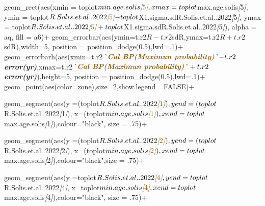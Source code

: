 \documentclass[
]{article}
\newenvironment{Shaded}{\begin{snugshade}}{\end{snugshade}}
\newcommand{\CommentTok}[1]{\textcolor[rgb]{0.56,0.35,0.01}{\textit{#1}}}
\newcommand{\InformationTok}[1]{\textcolor[rgb]{0.56,0.35,0.01}{\textbf{\textit{#1}}}}
\newcommand{\NormalTok}[1]{#1}
\newcommand{\OtherTok}[1]{\textcolor[rgb]{0.56,0.35,0.01}{#1}}
\begin{document}
\begin{Shaded}
\begin{Highlighting}[]
\NormalTok{  geom\_rect(aes(xmin = toplot$min.age.solis}\CommentTok{[}\OtherTok{5}\CommentTok{]}\NormalTok{, }
\NormalTok{                xmax = toplot$max.age.solis}\CommentTok{[}\OtherTok{5}\CommentTok{]}\NormalTok{, }
\NormalTok{                ymin = toplot$R.Solis.et.al..2022}\CommentTok{[}\OtherTok{5}\CommentTok{]}\NormalTok{{-}toplot$X1.sigma.sdR.Solis.et.al..2022}\CommentTok{[}\OtherTok{5}\CommentTok{]}\NormalTok{,}
\NormalTok{                ymax = toplot$R.Solis.et.al..2022}\CommentTok{[}\OtherTok{5}\CommentTok{]}\NormalTok{+toplot$X1.sigma.sdR.Solis.et.al..2022}\CommentTok{[}\OtherTok{5}\CommentTok{]}\NormalTok{),}
\NormalTok{            alpha = aq,}
\NormalTok{            fill = a6)+}
\NormalTok{  geom\_errorbar(aes(ymin=t.r2$R{-}t.r2$sdR,ymax=t.r2$R+t.r2$sdR),width=5,}
\NormalTok{                            position = position\_dodge(0.5),lwd=.1)+}
\NormalTok{  geom\_errorbarh(aes(xmin=t.r2$}\InformationTok{\textasciigrave{}Cal BP(Maximun probability)\textasciigrave{}}\NormalTok{{-}t.r2$}\InformationTok{\textasciigrave{}error(yr)\textasciigrave{}}\NormalTok{,xmax=t.r2$}\InformationTok{\textasciigrave{}Cal BP(Maximun probability)\textasciigrave{}}\NormalTok{+t.r2$}\InformationTok{\textasciigrave{}error(yr)\textasciigrave{}}\NormalTok{),height=5,}
\NormalTok{              position = position\_dodge(0.5),lwd=.1)+}
\NormalTok{              geom\_point(aes(color=zone),size=2,show.legend =FALSE)+}
  
\NormalTok{  geom\_segment(aes(y =(toplot$R.Solis.et.al..2022}\CommentTok{[}\OtherTok{1}\CommentTok{]}\NormalTok{),}
\NormalTok{                   yend =(toplot$R.Solis.et.al..2022}\CommentTok{[}\OtherTok{1}\CommentTok{]}\NormalTok{),}
\NormalTok{                   x=(toplot$min.age.solis}\CommentTok{[}\OtherTok{1}\CommentTok{]}\NormalTok{),}
\NormalTok{                   xend=toplot$max.age.solis}\CommentTok{[}\OtherTok{1}\CommentTok{]}\NormalTok{),colour="black", size = .75)+}
  
\NormalTok{  geom\_segment(aes(y =(toplot$R.Solis.et.al..2022}\CommentTok{[}\OtherTok{2}\CommentTok{]}\NormalTok{),}
\NormalTok{                   yend =(toplot$R.Solis.et.al..2022}\CommentTok{[}\OtherTok{2}\CommentTok{]}\NormalTok{),}
\NormalTok{                   x=(toplot$min.age.solis}\CommentTok{[}\OtherTok{2}\CommentTok{]}\NormalTok{),}
\NormalTok{                   xend=toplot$max.age.solis}\CommentTok{[}\OtherTok{2}\CommentTok{]}\NormalTok{),colour="black",size = .75)+}
  
\NormalTok{  geom\_segment(aes(y =toplot$R.Solis.et.al..2022}\CommentTok{[}\OtherTok{4}\CommentTok{]}\NormalTok{,}
\NormalTok{                   yend =toplot$R.Solis.et.al..2022}\CommentTok{[}\OtherTok{4}\CommentTok{]}\NormalTok{,}
\NormalTok{                   x=toplot$min.age.solis}\CommentTok{[}\OtherTok{4}\CommentTok{]}\NormalTok{,}
\NormalTok{                   xend=toplot$max.age.solis}\CommentTok{[}\OtherTok{4}\CommentTok{]}\NormalTok{),colour="black", size = .75)+}
  

\end{Highlighting}
\end{Shaded}
\end{document}

